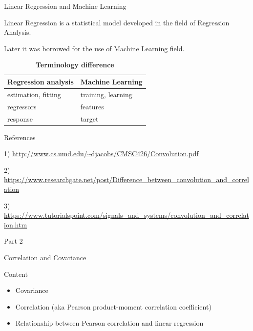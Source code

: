 \documentclass{beamer}
\begin{document}

\begin{frame}
{\centerline{Linear Regression and Machine Learning}}
Linear Regression is a statistical model developed in the field of Regression Analysis.

Later it was borrowed for the use of Machine Learning field.

\begin{table}[]
\centering
\caption{\textbf{Terminology difference}}
\begin{tabular}{|l|l|}
\toprule
\textbf{Regression analysis} & \textbf{Machine Learning} \\ \midrule
estimation, fitting          & training, learning         \\ \midrule
regressors                   & features                   \\ \midrule
response                     & target                    \\ \bottomrule
\end{tabular}
\end{table}

\end{frame}


\begin{frame}
{\centerline{References}}

1) \url{http://www.cs.umd.edu/~djacobs/CMSC426/Convolution.pdf}
\newline 

2) \url{https://www.researchgate.net/post/Difference\_between\_convolution\_and\_correlation}
\newline 

3) \url{https://www.tutorialspoint.com/signals\_and\_systems/convolution\_and\_correlation.htm}

\end{frame}

\begin{frame}
{\centerline{Part 2}}

\begin{center}
\Huge Correlation and Covariance
\end{center}
\end{frame}


\begin{frame}
{\centerline{Content}}

\begin{itemize}
\item Covariance
\item Correlation (aka Pearson product-moment correlation coefficient)
\item Relationship between Pearson correlation and linear regression
\end{itemize}
\end{frame}
\end{document}
